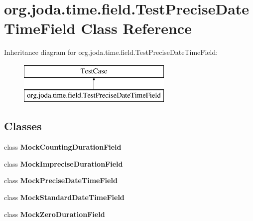 \hypertarget{classorg_1_1joda_1_1time_1_1field_1_1_test_precise_date_time_field}{\section{org.\-joda.\-time.\-field.\-Test\-Precise\-Date\-Time\-Field Class Reference}
\label{classorg_1_1joda_1_1time_1_1field_1_1_test_precise_date_time_field}
}
Inheritance diagram for org.\-joda.\-time.\-field.\-Test\-Precise\-Date\-Time\-Field\-:\begin{figure}[H]
\begin{center}
\leavevmode
\includegraphics[height=2.000000cm]{classorg_1_1joda_1_1time_1_1field_1_1_test_precise_date_time_field}
\end{center}
\end{figure}
\subsection*{Classes}
\begin{DoxyCompactItemize}
\item 
class {\bfseries Mock\-Counting\-Duration\-Field}
\item 
class {\bfseries Mock\-Imprecise\-Duration\-Field}
\item 
class {\bfseries Mock\-Precise\-Date\-Time\-Field}
\item 
class {\bfseries Mock\-Standard\-Date\-Time\-Field}
\item 
class {\bfseries Mock\-Zero\-Duration\-Field}
\end{DoxyCompactItemize}
